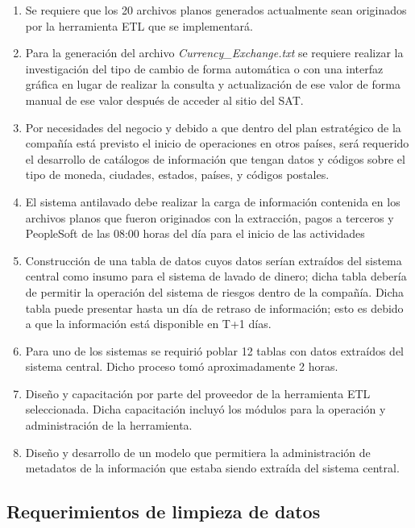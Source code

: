 \begin{enumerate}
\item Se requiere que los 20 archivos planos generados actualmente sean originados por la
  herramienta ETL que se implementará.

\item Para la generación del archivo \textit{Currency\_Exchange.txt} se requiere
  realizar la investigación del tipo de cambio de forma automática o con una
  interfaz gráfica en lugar de realizar la consulta y actualización de ese valor
  de forma manual de ese valor después de acceder al sitio del SAT.

\item Por necesidades del negocio y debido a que dentro del plan estratégico de
  la compañía está previsto el inicio de operaciones en otros países, será
  requerido el desarrollo de catálogos de información que tengan datos y
  códigos sobre el tipo de moneda, ciudades, estados, países, y códigos
  postales.

\item El sistema antilavado debe realizar la carga de información contenida en
  los archivos planos que fueron originados con la extracción, pagos a terceros
  y PeopleSoft de las 08:00 horas del día para el inicio de las actividades

\item Construcción de una tabla de datos cuyos datos serían extraídos del
  sistema central como insumo para el sistema de lavado de dinero; dicha tabla
  debería de permitir la operación del sistema de riesgos dentro de la
  compañía. Dicha tabla puede presentar hasta un día de retraso de información;
  esto es debido a que la información está disponible en T+1 días.

\item Para uno de los sistemas se requirió poblar 12 tablas con datos extraídos
  del sistema central. Dicho proceso tomó aproximadamente 2 horas.

\item Diseño y capacitación por parte del proveedor de la herramienta ETL
  seleccionada. Dicha capacitación incluyó los módulos para la operación y
  administración de la herramienta.

\item Diseño y desarrollo de un modelo que permitiera la administración de
  metadatos de la información que estaba siendo extraída del sistema central.

\end{enumerate}

\subsection{Requerimientos de limpieza de datos}

